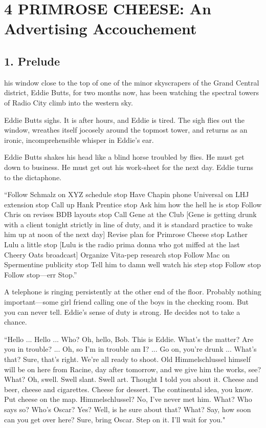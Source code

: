 \documentclass[nohyper,openany,nobib]{tufte-book}
\let\oldchapter\chapter
\def\chapter{%
  \setcounter{footnote}{0}%
  \oldchapter
}
\begin{document}
\chapter[4 \hspace*{1mm} PRIMROSE CHEESE: An Advertising Accouchement]{4 PRIMROSE CHEESE: An Advertising Accouchement}

\section{1. Prelude}

 his window close to the top of one of the minor skyscrapers of the
Grand Central district, Eddie Butts, for two months now, has been
watching the spectral towers of Radio City climb into the western sky.



Eddie Butts sighs. It is after hours, and Eddie is tired. The sigh flies
out the window, wreathes itself jocosely around the topmost tower, and
returns as an ironic, incomprehensible whisper in Eddie's ear.

Eddie Butts shakes his head like a blind horse troubled by flies. He
must get down to business. He must get out his work-sheet for the next
day. Eddie turns to the dictaphone.

``Follow Schmalz on XYZ schedule stop Have Chapin phone Universal on LHJ
extension stop Call up Hank Prentice stop Ask him how the hell he is
stop Follow Chris on revises BDB layouts stop Call Gene at the Club
{[}Gene is getting drunk with a client tonight strictly in line of duty,
and it is standard practice to wake him up at noon of the next day{]}
Revise plan for Primrose Cheese stop Lather Lulu a little stop {[}Lulu
is the radio prima donna who got miffed at the last Cheery Oats
broadcast{]} Organize Vita-pep research stop Follow Mac on Spermentine
publicity stop Tell him to damn well watch his step stop Follow stop
Follow stop---err Stop.''

A telephone is ringing persistently at the other end of the floor.
Probably nothing important---some girl friend calling one of the boys in
the checking room. But you can never tell. Eddie's sense of duty is
strong. He decides not to take a chance.

``Hello ... Hello ... Who? Oh, hello, Bob. This is Eddie. What's the
matter? Are you in trouble? ... Oh, so I'm in trouble am I? ... Go on,
you're drunk ... What's that? Sure, that's right. We're all ready to
shoot. Old Himmelschlussel himself will be on here from Racine, day
after tomorrow, and we give him the works, see? What? Oh, swell. Swell
slant. Swell art. Thought I told you about it. Cheese and beer, cheese
and cigarettes. Cheese for dessert. The continental idea, you know. Put
cheese on the map. Himmelschlussel? No, I've never met him. What? Who
says so? Who's Oscar? Yes? Well, is he sure about that? What? Say, how
soon can you get over here? Sure, bring Oscar. Step on it. I'll wait for
you."
\end{document}
